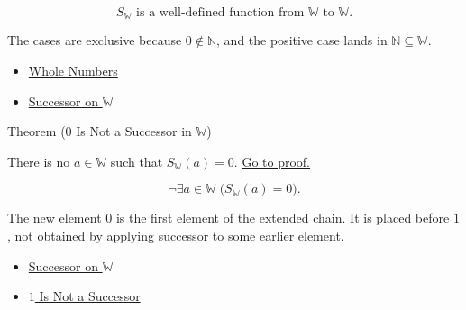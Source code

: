 \begin{remark*}
\[
S_{\mathbb{W}}\text{ is a well-defined function from }\mathbb{W}
\text{ to }\mathbb{W}.
\]
\end{remark*}

\begin{remark*}[Interpretation]
The cases are exclusive because $0\notin\mathbb{N}$, and the positive case
lands in $\mathbb{N}\subseteq\mathbb{W}$.
\end{remark*}

\begin{dependencies}
\begin{itemize}
  \item \hyperref[def:whole-numbers]{Whole Numbers}
  \item \hyperref[def:successor-on-w]{Successor on $\mathbb{W}$}
\end{itemize}
\end{dependencies}

\begin{theorembox}{Theorem (\texorpdfstring{$0$}{0} Is Not a Successor in \texorpdfstring{$\mathbb{W}$}{W})}
\begin{theorem}
\label{thm:zero-is-not-successor-in-w}
There is no $a\in\mathbb{W}$ such that $S_{\mathbb{W}}(a)=0$.
\hyperref[prf:zero-is-not-successor-in-w]{Go to proof.}
\end{theorem}
\end{theorembox}

\begin{remark*}
\[
\neg\exists a\in\mathbb{W}\;\bigl(S_{\mathbb{W}}(a)=0\bigr).
\]
\end{remark*}

\begin{remark*}[Interpretation]
The new element $0$ is the first element of the extended chain. It is placed
before $1$, not obtained by applying successor to some earlier element.
\end{remark*}

\begin{dependencies}
\begin{itemize}
  \item \hyperref[def:successor-on-w]{Successor on $\mathbb{W}$}
  \item \hyperref[ax:peano-base-not-successor]{$1$ Is Not a Successor}
\end{itemize}
\end{dependencies}

